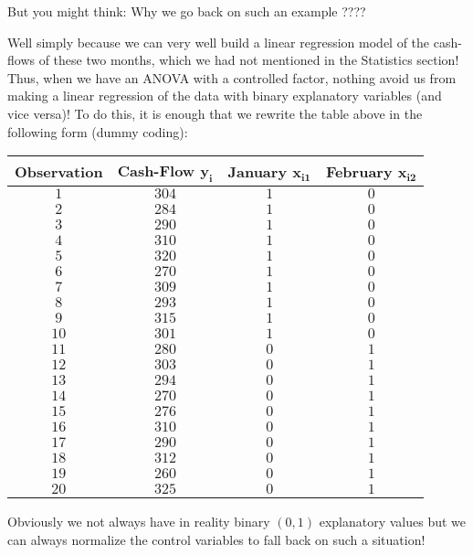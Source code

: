 	But you might think: Why we go back on such an example ????

	Well simply because we can very well build a linear regression model of the cash-flows of these two months, which we had not mentioned in the Statistics section! Thus, when we have an ANOVA with a controlled factor, nothing avoid us from making a linear regression of the data with binary explanatory variables (and vice versa)! To do this, it is enough that we rewrite the table above in the following form (dummy coding):
	\begin{table}[H]
	\centering
			\begin{tabular}{|c|c|c|c|}
				\hline
				\cellcolor{black!30}\textbf{Observation} & \cellcolor{black!30}\textbf{Cash-Flow $\pmb{y_i}$} & \cellcolor{black!30}\textbf{January $\pmb{x_{i1}}$} & \cellcolor{black!30}\textbf{February $\pmb{x_{i2}}$} \\ \hline
				$1$ & $304$ & $1$ & $0$ \\ \hline
				$2$ & $284$ & $1$ & $0$ \\ \hline
				$3$ & $290$ & $1$ & $0$ \\ \hline
				$4$ & $310$ & $1$ & $0$ \\ \hline
				$5$ & $320$ & $1$ & $0$ \\ \hline
				$6$ & $270$ & $1$ & $0$ \\ \hline
				$7$ & $309$ & $1$ & $0$ \\ \hline
				$8$ & $293$ & $1$ & $0$ \\ \hline
				$9$ & $315$ & $1$ & $0$ \\ \hline
				$10$ & $301$ & $1$ & $0$ \\ \hline
				$11$ & $280$ & $0$ & $1$ \\ \hline
				$12$ & $303$ & $0$ & $1$ \\ \hline
				$13$ & $294$ & $0$ & $1$ \\ \hline
				$14$ & $270$ & $0$ & $1$ \\ \hline
				$15$ & $276$ & $0$ & $1$ \\ \hline
				$16$ & $310$ & $0$ & $1$ \\ \hline
				$17$ & $290$ & $0$ & $1$ \\ \hline
				$18$ & $312$ & $0$ & $1$ \\ \hline
				$19$ & $260$ & $0$ & $1$ \\ \hline
				$20$ & $325$ & $0$ & $1$ \\ \hline
		\end{tabular}
	\end{table}
	Obviously we not always have in reality binary $(0,1)$ explanatory values but we can always normalize the control variables to fall back on such a situation!
	
